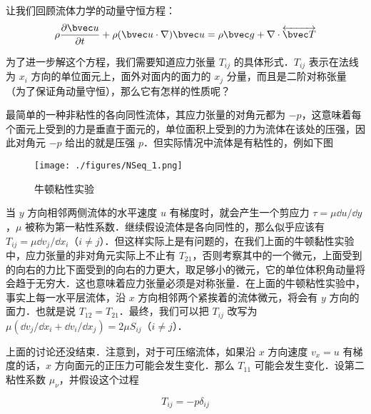 
让我们回顾流体力学的动量守恒方程：
\begin{equation}
\rho \frac{\partial \bvec u}{\partial t}+\rho(\bvec u\cdot \nabla)\bvec u=\rho \bvec g+\nabla\cdot \overleftrightarrow {\bvec T}
\end{equation}

为了进一步解这个方程，我们需要知道应力张量 $T_{ij}$ 的具体形式．$T_{ij}$ 表示在法线为 $x_i$ 方向的单位面元上，面外对面内的面力的 $x_j$ 分量，而且是二阶对称张量（为了保证角动量守恒），那么它有怎样的性质呢？

最简单的一种非粘性的各向同性流体，其应力张量的对角元都为 $-p$，这意味着每个面元上受到的力是垂直于面元的，单位面积上受到的力为流体在该处的压强，因此对角元 $-p$ 给出的就是压强 $p$．但实际情况中流体是有粘性的，例如下图
\begin{figure}[ht]
\centering
\texttt{[image: ./figures/NSeq\_1.png]}
\caption{牛顿粘性实验} \label{NSeq_fig1}
\end{figure}
当 $y$ 方向相邻两侧流体的水平速度 $u$ 有梯度时，就会产生一个剪应力 $\tau=\mu \dd u/\dd y$，$\mu$ 被称为第一粘性系数．继续假设流体是各向同性的，那么似乎应该有 $T_{ij}=\mu \dd v_j/\dd x_i$（$i\neq j$）．但这样实际上是有问题的，在我们上面的牛顿黏性实验中，应力张量的非对角元实际上不止有 $T_{21}$，否则考察其中的一个微元，上面受到的向右的力比下面受到的向右的力更大，取足够小的微元，它的单位体积角动量将会趋于无穷大．这也意味着应力张量必须是对称张量．在上面的牛顿粘性实验中，事实上每一水平层流体，沿 $x$ 方向相邻两个紧挨着的流体微元，将会有 $y$ 方向的面力．也就是说 $T_{12}=T_{21}$．最终，我们可以把 $T_{ij}$ 改写为 $\mu (\dd v_j/\dd x_i+\dd v_i/\dd x_j)=2\mu S_{ij}$（$i\neq j$）．

上面的讨论还没结束．注意到，对于可压缩流体，如果沿 $x$ 方向速度 $v_x=u$ 有梯度的话，$x$ 方向面元的正压力可能会发生变化．那么 $T_{11}$ 可能会发生变化．设第二粘性系数 $\mu_\nu$，并假设这个过程

\begin{equation}
T_{ij}=-p\delta_{ij}
\end{equation}
